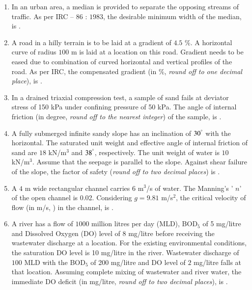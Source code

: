 \documentclass[journal]{IEEEtran}
\begin{document}
\begin{enumerate}
\item In an urban area, a median is provided to separate the opposing streams of traffic. As per IRC -- $86$ : $1983$, the desirable minimum width  of the median, is \underline{\hspace{2cm}}.  \hfill {}


\item A road in a hilly terrain is to be laid at a gradient of $4.5$ \%. A horizontal curve of radius $100$ m is laid at a location on this road. Gradient needs to be eased due to combination of curved horizontal and vertical profiles of the road. As per IRC, the compensated gradient (in \%, \emph{round off to one decimal place}), is \underline{\hspace{2cm}}. \hfill {}

\item In a drained triaxial compression test, a sample of sand fails at deviator stress of 150 kPa under confining pressure of 50 kPa. The angle of internal friction (in degree, \emph{round off to the nearest integer}) of the sample, is \underline{\hspace{2cm}}.  \hfill {}

\item A fully submerged infinite sandy slope has an inclination of $30^\degree$ with the horizontal. The saturated unit weight and effective angle of internal friction of sand are $18$ kN/m$^3$ and $38^\degree$, respectively. The unit weight of water is $10$ kN/m$^3$. Assume that the seepage is parallel to the slope. Against shear failure of the slope, the factor of safety (\emph{round off to two decimal places}) is \underline{\hspace{2cm}}.\hfill {}

\item A $4$ m wide rectangular channel carries 6 m$^3$/s of water. The Manning's ' $n$'  of the open channel is 0.02. Considering $g=9.81$ m/s$^{2}$, the critical velocity of flow (in m/s, ) in the channel, is \underline{\hspace{2cm}}. \hfill {}

\item A river has a flow of $1000$ million litres per day (MLD), BOD$_{5}$ of 5 mg/litre and Dissolved Oxygen (DO) level of $8$ mg/litre before receiving the wastewater discharge at a location. For the existing environmental conditions, the saturation DO level is 10 mg/litre in the river. Wastewater discharge of $100$ MLD with the BOD$_{5}$ of 200 mg/litre and DO level of $2$ mg/litre falls at that location. Assuming complete mixing of wastewater and river water, the immediate DO deficit (in mg/litre, \emph{round off to two decimal places}), is \underline{\hspace{2cm}}.  \hfill {}


\end{enumerate}
\end{document}
